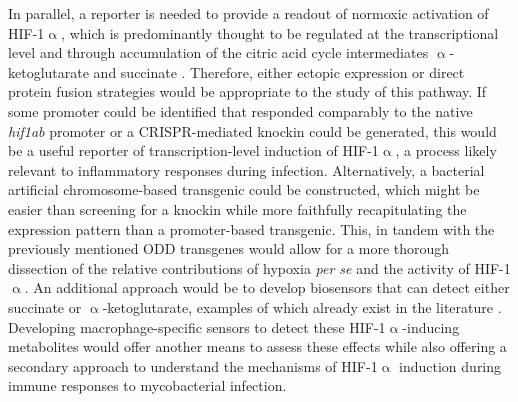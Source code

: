 In parallel, a reporter is needed to provide a readout of normoxic activation of HIF\hyp{}1$\upalpha$, which is predominantly thought to be regulated at the transcriptional level and through accumulation of the citric acid cycle intermediates $\upalpha$\hyp{}ketoglutarate and succinate \citep{Meng2018, Palazon2014, Tannahill2013, Williams2018}. Therefore, either ectopic expression or direct protein fusion strategies would be appropriate to the study of this pathway. If some promoter could be identified that responded comparably to the native \textit{hif1ab} promoter or a CRISPR\hyp{}mediated knockin could be generated, this would be a useful reporter of transcription\hyp{}level induction of HIF\hyp{}1$\upalpha$, a process likely relevant to inflammatory responses during infection. Alternatively, a bacterial artificial chromosome\hyp{}based transgenic could be constructed, which might be easier than screening for a knockin while more faithfully recapitulating the expression pattern than a promoter\hyp{}based transgenic. This, in tandem with the previously mentioned ODD transgenes would allow for a more thorough dissection of the relative contributions of hypoxia \textit{per se} and the activity of HIF\hyp{}1$\upalpha$. An additional approach would be to develop biosensors that can detect either succinate or $\upalpha$\hyp{}ketoglutarate, examples of which already exist in the literature \citep{Liu2017b, Suzuki2021, Luddecke2017}. Developing macrophage\hyp{}specific sensors to detect these HIF\hyp{}1$\upalpha$\hyp{}inducing metabolites would offer another means to assess these effects while also offering a secondary approach to understand the mechanisms of HIF\hyp{}1$\upalpha$ induction during immune responses to mycobacterial infection. 

